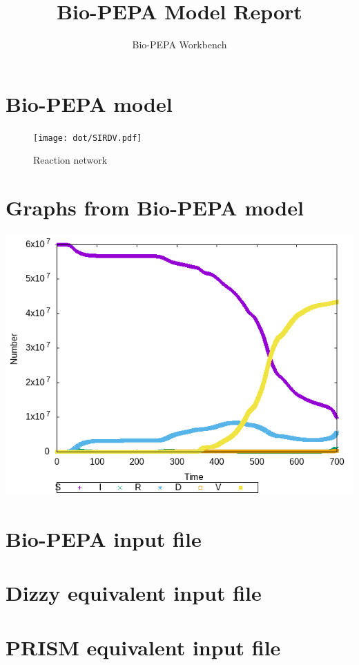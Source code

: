 \documentclass{llncs}
\title{Bio-PEPA Model Report}
\author{Bio-PEPA Workbench}
\institute{\today}
\begin{document}
\maketitle
\section{Bio-PEPA model}

\begin{figure}[htbp]
\begin{center}
\texttt{[image: dot/SIRDV.pdf]}
\caption{Reaction network}
\end{center}
\end{figure}
\newpage
\section{Graphs from Bio-PEPA model}
\includegraphics[scale=1]{png/SIRDV001_sundials_results_0}
\appendix
\newpage
\section{Bio-PEPA input file}

\newpage
\section{Dizzy equivalent input file}

\newpage
\section{PRISM equivalent input file}

\end{document}
